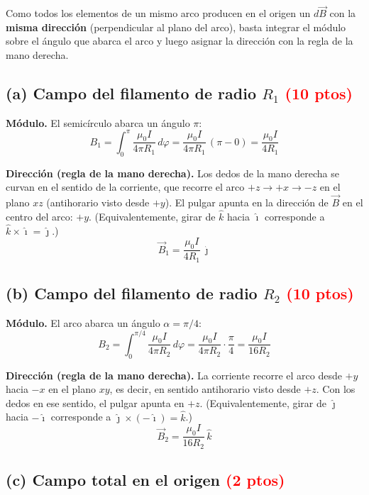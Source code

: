\documentclass[12pt,letterpaper]{article}
\newcommand{\ptos}[1]{\textcolor{red}{\textbf{(#1 ptos)}}}
\begin{document}
\medskip
\noindent Como todos los elementos de un mismo arco producen en el origen un $d\vec{B}$ con la
\textbf{misma direcci\'on} (perpendicular al plano del arco), basta integrar el m\'odulo sobre el
\'angulo que abarca el arco y luego asignar la direcci\'on con la regla de la mano derecha.

\subsection*{(a) Campo del filamento de radio $R_1$ \ptos{10}}

\noindent\textbf{M\'odulo.} El semic\'irculo abarca un \'angulo $\pi$:
\[
    B_1 = \int_0^{\pi}\frac{\mu_0 I}{4\pi R_1}\,d\varphi
        = \frac{\mu_0 I}{4\pi R_1}\,(\pi - 0)
        = \frac{\mu_0 I}{4R_1}
\]

\noindent\textbf{Direcci\'on (regla de la mano derecha).} Los dedos de la mano derecha se curvan en
el sentido de la corriente, que recorre el arco $+z\to+x\to-z$ en el plano $xz$ (antihorario visto
desde $+y$). El pulgar apunta en la direcci\'on de $\vec{B}$ en el centro del arco: \textbf{$+y$}.
(Equivalentemente, girar de $\hat{k}$ hacia $\hat{\imath}$ corresponde a
$\hat{k}\times\hat{\imath} = \hat{\jmath}$.)
\[
    \boxed{\vec{B}_1 = \frac{\mu_0 I}{4R_1}\,\hat{\jmath}}
\]

\subsection*{(b) Campo del filamento de radio $R_2$ \ptos{10}}

\noindent\textbf{M\'odulo.} El arco abarca un \'angulo $\alpha = \pi/4$:
\[
    B_2 = \int_0^{\pi/4}\frac{\mu_0 I}{4\pi R_2}\,d\varphi
        = \frac{\mu_0 I}{4\pi R_2}\cdot\frac{\pi}{4}
        = \frac{\mu_0 I}{16R_2}
\]

\noindent\textbf{Direcci\'on (regla de la mano derecha).} La corriente recorre el arco desde $+y$
hacia $-x$ en el plano $xy$, es decir, en sentido antihorario visto desde $+z$. Con los dedos en ese
sentido, el pulgar apunta en \textbf{$+z$}. (Equivalentemente, girar de $\hat{\jmath}$ hacia
$-\hat{\imath}$ corresponde a $\hat{\jmath}\times(-\hat{\imath}) = \hat{k}$.)
\[
    \boxed{\vec{B}_2 = \frac{\mu_0 I}{16R_2}\,\hat{k}}
\]

\subsection*{(c) Campo total en el origen \ptos{2}}
\end{document}
